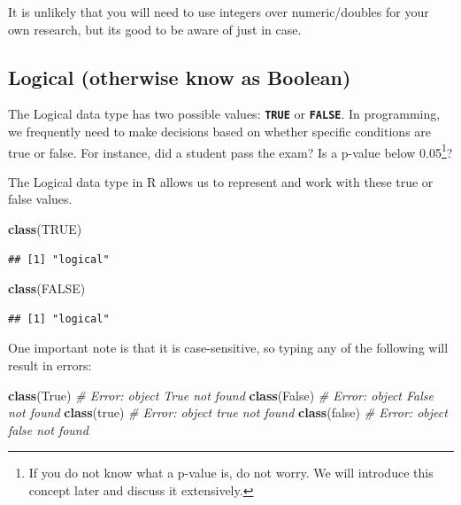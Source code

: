 \documentclass[
]{book}
\newenvironment{Shaded}{\begin{snugshade}}{\end{snugshade}}
\newcommand{\CommentTok}[1]{\textcolor[rgb]{0.56,0.35,0.01}{\textit{#1}}}
\newcommand{\ConstantTok}[1]{\textcolor[rgb]{0.56,0.35,0.01}{#1}}
\newcommand{\FunctionTok}[1]{\textcolor[rgb]{0.13,0.29,0.53}{\textbf{#1}}}
\newcommand{\NormalTok}[1]{#1}
\begin{document}
It is unlikely that you will need to use integers over numeric/doubles for your own research, but its good to be aware of just in case.

\subsection{Logical (otherwise know as Boolean)}\label{logical-otherwise-know-as-boolean}

The Logical data type has two possible values: \textbf{\texttt{TRUE}} or \textbf{\texttt{FALSE}}. In programming, we frequently need to make decisions based on whether specific conditions are true or false. For instance, did a student pass the exam? Is a p-value below 0.05\footnote{If you do not know what a p-value is, do not worry. We will introduce this concept later and discuss it extensively.}?

The Logical data type in R allows us to represent and work with these true or false values.

\begin{Shaded}
\begin{Highlighting}[]
\FunctionTok{class}\NormalTok{(}\ConstantTok{TRUE}\NormalTok{)}
\end{Highlighting}
\end{Shaded}

\begin{verbatim}
## [1] "logical"
\end{verbatim}

\begin{Shaded}
\begin{Highlighting}[]
\FunctionTok{class}\NormalTok{(}\ConstantTok{FALSE}\NormalTok{)}
\end{Highlighting}
\end{Shaded}

\begin{verbatim}
## [1] "logical"
\end{verbatim}

One important note is that it is case-sensitive, so typing any of the following will result in errors:

\begin{Shaded}
\begin{Highlighting}[]
\FunctionTok{class}\NormalTok{(True)   }\CommentTok{\# Error: object \textquotesingle{}True\textquotesingle{} not found}
\FunctionTok{class}\NormalTok{(False)  }\CommentTok{\# Error: object \textquotesingle{}False\textquotesingle{} not found}
\FunctionTok{class}\NormalTok{(true)   }\CommentTok{\# Error: object \textquotesingle{}true\textquotesingle{} not found}
\FunctionTok{class}\NormalTok{(false)  }\CommentTok{\# Error: object \textquotesingle{}false\textquotesingle{} not found}
\end{Highlighting}
\end{Shaded}
\end{document}
